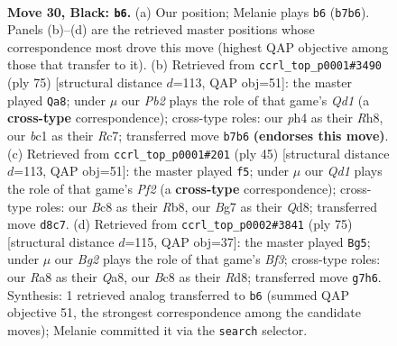 \documentclass[11pt]{article}
\begin{document}
\clearpage

\begin{figure}[p]\centering
\begin{subfigure}{0.46\textwidth}\centering
\resizebox{\linewidth}{!}{%
\newchessgame
\chessboard[
  setfen={r1bq2k1/1p1pr1bp/p3p3/2P2p1B/P1nP1Q1P/2N2N2/1P3PK1/R1B2R2 b - - 5 30},
  showmover=false,
  pgfstyle=straightmove, color=movearrow, markmove={b7-b6}
]}
\caption{}
\end{subfigure}\hfill
\begin{subfigure}{0.46\textwidth}\centering
\resizebox{\linewidth}{!}{%
\newchessgame
\chessboard[
  setfen={3q3r/p1r1bpk1/1pbp2p1/4p2p/P1P1P3/1PNR1B1P/3Q1PP1/5RK1 b - - 18 38},
  showmover=false,
  pgfstyle=straightmove, color=movearrow, markmove={d8-a8}
]}
\caption{}
\end{subfigure}
\\[4pt]
\begin{subfigure}{0.46\textwidth}\centering
\resizebox{\linewidth}{!}{%
\newchessgame
\chessboard[
  setfen={br1qrbk1/5ppn/p6p/1ppP4/2n1P3/P4N1P/2B2PP1/R1BQRNK1 b - - 0 23},
  showmover=false,
  pgfstyle=straightmove, color=movearrow, markmove={f7-f5}
]}
\caption{}
\end{subfigure}\hfill
\begin{subfigure}{0.46\textwidth}\centering
\resizebox{\linewidth}{!}{%
\newchessgame
\chessboard[
  setfen={q2r3k/3br1p1/2p1pbnp/1pP2p2/3P4/PB1R2P1/1B1Q1PKP/2N1R3 b - - 7 38},
  showmover=false,
  pgfstyle=straightmove, color=movearrow, markmove={f6-g5}
]}
\caption{}
\end{subfigure}
\caption{\textbf{Move 30, Black: \texttt{b6}.} (a) Our position; Melanie plays \texttt{b6} (\texttt{b7b6}). Panels (b)--(d) are the retrieved master positions whose correspondence most drove this move (highest QAP objective among those that transfer to it). (b) Retrieved from \texttt{ccrl\_top\_p0001\#3490} (ply 75) [structural distance $d$=113, QAP obj=51]: the master played \texttt{Qa8}; under $\mu$ our \emph{Pb2} plays the role of that game's \emph{Qd1} (a \textbf{cross-type} correspondence); cross-type roles: our \emph{p}h4 as their \emph{R}h8, our \emph{b}c1 as their \emph{R}c7; transferred move \texttt{b7b6} \textbf{(endorses this move)}. (c) Retrieved from \texttt{ccrl\_top\_p0001\#201} (ply 45) [structural distance $d$=113, QAP obj=51]: the master played \texttt{f5}; under $\mu$ our \emph{Qd1} plays the role of that game's \emph{Pf2} (a \textbf{cross-type} correspondence); cross-type roles: our \emph{B}c8 as their \emph{R}b8, our \emph{B}g7 as their \emph{Q}d8; transferred move \texttt{d8c7}. (d) Retrieved from \texttt{ccrl\_top\_p0002\#3841} (ply 75) [structural distance $d$=115, QAP obj=37]: the master played \texttt{Bg5}; under $\mu$ our \emph{Bg2} plays the role of that game's \emph{Bf3}; cross-type roles: our \emph{R}a8 as their \emph{Q}a8, our \emph{B}c8 as their \emph{R}d8; transferred move \texttt{g7h6}. Synthesis: 1 retrieved analog transferred to \texttt{b6} (summed QAP objective 51, the strongest correspondence among the candidate moves); Melanie committed it via the \texttt{search} selector.}
\label{fig:thought-m59}
\end{figure}
\end{document}
